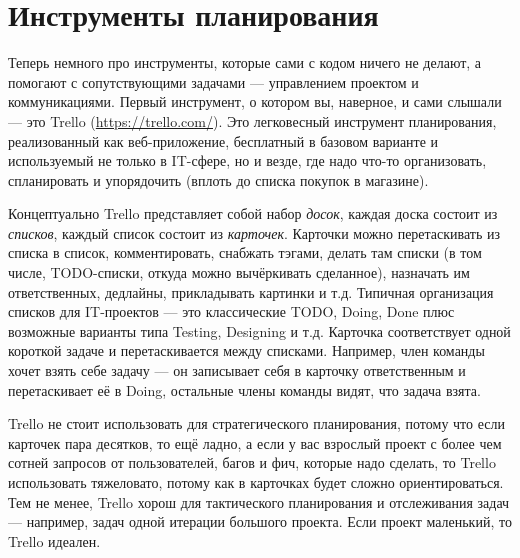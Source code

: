 \documentclass{../../text-style}
\begin{document}
\section{Инструменты планирования}

Теперь немного про инструменты, которые сами с кодом ничего не делают, а помогают с сопутствующими задачами --- управлением проектом и коммуникациями. Первый инструмент, о котором вы, наверное, и сами слышали --- это Trello (\url{https://trello.com/}). Это легковесный инструмент планирования, реализованный как веб-приложение, бесплатный в базовом варианте и используемый не только в IT-сфере, но и везде, где надо что-то организовать, спланировать и упорядочить (вплоть до списка покупок в магазине).

Концептуально Trello представляет собой набор \textit{досок}, каждая доска состоит из \textit{списков}, каждый список состоит из \textit{карточек}. Карточки можно перетаскивать из списка в список, комментировать, снабжать тэгами, делать там списки (в том числе, TODO-списки, откуда можно вычёркивать сделанное), назначать им ответственных, дедлайны, прикладывать картинки и т.д. Типичная организация списков для IT-проектов --- это классические TODO, Doing, Done плюс возможные варианты типа Testing, Designing и т.д. Карточка соответствует одной короткой задаче и перетаскивается между списками. Например, член команды хочет взять себе задачу --- он записывает себя в карточку ответственным и перетаскивает её в Doing, остальные члены команды видят, что задача взята.

Trello не стоит использовать для стратегического планирования, потому что если карточек пара десятков, то ещё ладно, а если у вас взрослый проект с более чем сотней запросов от пользователей, багов и фич, которые надо сделать, то Trello использовать тяжеловато, потому как в карточках будет сложно ориентироваться. Тем не менее, Trello хорош для тактического планирования и отслеживания задач --- например, задач одной итерации большого проекта. Если проект маленький, то Trello идеален.
\end{document}
